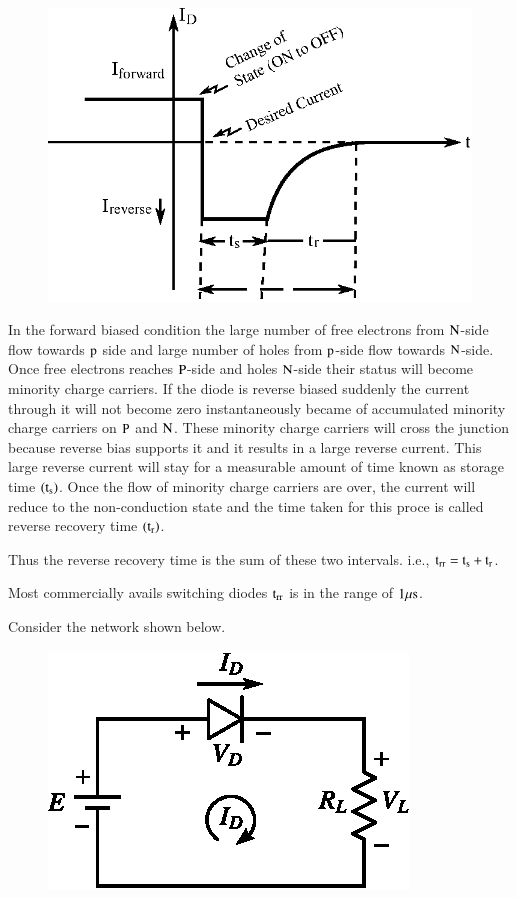 \begin{figure}[H]
\centering
\includegraphics{chap1/addfig2.eps}
\end{figure}
In the forward biased condition the large number of free electrons from $\textrm{N}$-side flow towards $\textrm{p}$ side and large number of holes from $\textrm{p}$-side flow towards $\textrm{N}$-side. Once free electrons reaches $\textrm{P}$-side and holes $\textrm{N}$-side their status will become minority charge carriers. If the diode is reverse biased suddenly the current through it will not become zero instantaneously became of accumulated minority charge carriers on $\textrm{P}$ and $\textrm{N}$. These minority charge carriers will cross the junction because reverse bias supports it and it results in a large reverse current. This large reverse current will stay for a measurable amount of time known as storage time $(\textrm{t}_{\textrm{s}})$. Once the flow of minority charge carriers are over, the current will reduce to the non-conduction state and the time taken for this proce is called reverse recovery time $(\textrm{t}_{\textrm{r}})$.

Thus the reverse recovery time is the sum of these two intervals. i.e., $\textrm{t}_{\textrm{r}\textrm{r}}=\textrm{t}_{\textrm{s}}+\textrm{t}_{\textrm{r}}$.


Most commercially avails switching diodes $\textrm{t}_{\textrm{r}\textrm{r}}$ is in the range of $1\mu\textrm{s}$.


\smallskip
{}

Consider the network shown below.
\begin{figure}[H]
\centering
\includegraphics{chap1/fig1.27.eps}
\caption{}\label{fig1.27}
\end{figure}

